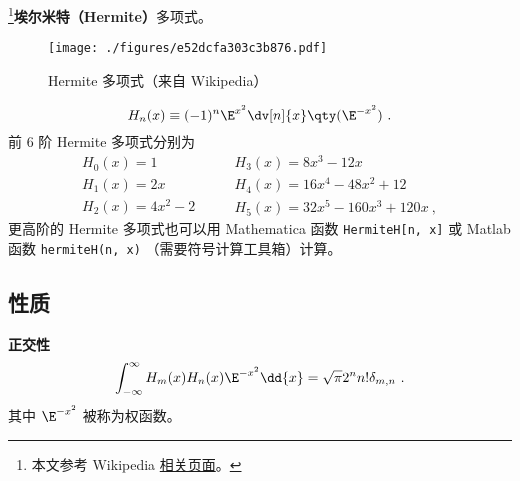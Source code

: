 
\begin{issues}
\issueDraft
\end{issues}

\footnote{本文参考 Wikipedia \href{https://en.wikipedia.org/wiki/Hermite_polynomials}{相关页面}。}\textbf{埃尔米特（Hermite）}多项式。

\begin{figure}[ht]
\centering
\texttt{[image: ./figures/e52dcfa303c3b876.pdf]}
\caption{Hermite 多项式（来自 Wikipedia）} \label{fig_HermiP_1}
\end{figure}

\begin{equation}
H_n(x) \equiv (- 1)^n \E^{x^2} \dv[n]{x} \qty(\E^{-x^2})~.
\end{equation}
前 6 阶 Hermite 多项式分别为
\begin{equation}
\begin{array}{l}
H_0(x) = 1\\
H_1(x) = 2x\\
H_2(x) = 4x^2 - 2
\end{array}
\qquad
\begin{array}{l}
H_3(x) = 8x^3 - 12x\\
H_4(x) = 16x^4 - 48x^2 + 12\\
H_5(x) = 32x^5 - 160x^3 + 120x~,
\end{array}
\end{equation}
更高阶的 Hermite 多项式也可以用 Mathematica 函数 \verb|HermiteH[n, x]| 或 Matlab 函数 \verb|hermiteH(n, x)| （需要符号计算工具箱）计算。

\subsection{性质}
\textbf{正交性}
\begin{equation}%
\int_{-\infty}^\infty H_m(x) H_n(x) \E^{-x^2} \dd{x} = \sqrt{\pi}2^n n! \delta_{m,n}~.
\end{equation}
其中 $\E^{-x^2}$ 被称为权函数。
